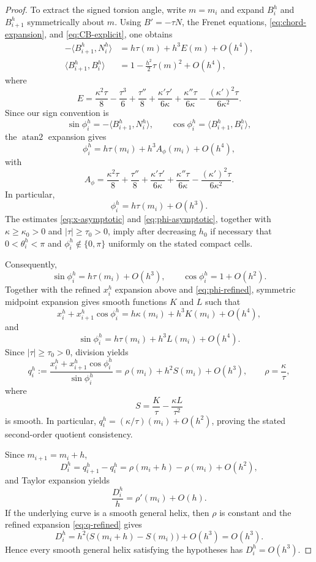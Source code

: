 \documentclass[10pt,a4paper]{amsart}
\theoremstyle{definition}
\theoremstyle{remark}
\numberwithin{equation}{section}
\begin{document}
\begin{proof}
To extract the signed torsion angle, write \(m=m_i\) and expand
\(B_i^h\) and \(B_{i+1}^h\) symmetrically about \(m\).  Using
\(B'=-\tau N\), the Frenet equations, \eqref{eq:chord-expansion},
and \eqref{eq:CB-explicit}, one obtains
\begin{align}
-\bigl\langle B_{i+1}^h,N_i^h\bigr\rangle
&=
h\tau(m)+h^3E(m)+O(h^4),
\label{eq:sinphi-expanded}\\
\bigl\langle B_{i+1}^h,B_i^h\bigr\rangle
&=
1-\frac{h^2}{2}\tau(m)^2+O(h^4),
\label{eq:cosphi-expanded}
\end{align}
where
\[
E=
\frac{\kappa^2\tau}{8}-\frac{\tau^3}{6}
+\frac{\tau''}{8}
+\frac{\kappa'\tau'}{6\kappa}
+\frac{\kappa''\tau}{6\kappa}
-\frac{(\kappa')^2\tau}{6\kappa^2}.
\]
Since our sign convention is
\[
\sin\phi_i^h=-\langle B_{i+1}^h,N_i^h\rangle,
\qquad
\cos\phi_i^h=\langle B_{i+1}^h,B_i^h\rangle,
\]
the \(\operatorname{atan2}\) expansion gives
\begin{equation}
\phi_i^h
=
h\tau(m_i)+h^3A_\phi(m_i)+O(h^4),
\label{eq:phi-refined}
\end{equation}
with
\[
A_\phi=
\frac{\kappa^2\tau}{8}
+\frac{\tau''}{8}
+\frac{\kappa'\tau'}{6\kappa}
+\frac{\kappa''\tau}{6\kappa}
-\frac{(\kappa')^2\tau}{6\kappa^2}.
\]
In particular,
\begin{equation}
\phi_i^h=h\tau(m_i)+O(h^3).
\label{eq:phi-asymptotic}
\end{equation}
The estimates \eqref{eq:x-asymptotic} and \eqref{eq:phi-asymptotic}, together with $\kappa\ge\kappa_0>0$ and $|\tau|\ge\tau_0>0$, imply after decreasing $h_0$ if necessary that $0<\theta_i^h<\pi$ and $\phi_i^h\notin\{0,\pi\}$ uniformly on the stated compact cells.

Consequently,
\[
\sin\phi_i^h=h\tau(m_i)+O(h^3),
\qquad
\cos\phi_i^h=1+O(h^2).
\]
Together with the refined $x_i^h$ expansion above and \eqref{eq:phi-refined}, symmetric midpoint expansion gives smooth functions $K$ and $L$ such that
\[
x_i^h+x_{i+1}^h\cos\phi_i^h
=
h\kappa(m_i)+h^3K(m_i)+O(h^4),
\]
and
\[
\sin\phi_i^h
=
h\tau(m_i)+h^3L(m_i)+O(h^4).
\]
Since \(|\tau|\ge\tau_0>0\), division yields
\begin{equation}
q_i^h:=
\frac{x_i^h+x_{i+1}^h\cos\phi_i^h}{\sin\phi_i^h}
=
\rho(m_i)+h^2S(m_i)+O(h^3),
\qquad
\rho=\frac{\kappa}{\tau},
\label{eq:q-refined}
\end{equation}
where
\[
S=\frac{K}{\tau}-\frac{\kappa L}{\tau^2}
\]
is smooth. In particular, $q_i^h=(\kappa/\tau)(m_i)+O(h^2)$, proving the stated second-order quotient consistency.

Since $m_{i+1}=m_i+h$,
\[
D_i^h=q_{i+1}^h-q_i^h
=\rho(m_i+h)-\rho(m_i)+O(h^2),
\]
and Taylor expansion yields
\[
\frac{D_i^h}{h}=\rho'(m_i)+O(h).
\]
If the underlying curve is a smooth general helix, then $\rho$ is constant and the refined expansion \eqref{eq:q-refined} gives
\[
D_i^h
=h^2\bigl(S(m_i+h)-S(m_i)\bigr)+O(h^3)
=O(h^3).
\]
Hence every smooth general helix satisfying the hypotheses has $D_i^h=O(h^3)$.
\end{proof}
\end{document}
